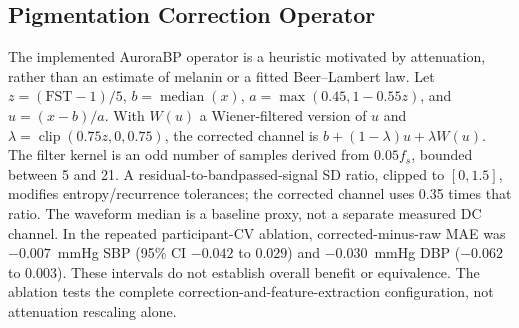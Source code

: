 \documentclass[journal]{IEEEtran}
\begin{document}
\subsection{Pigmentation Correction Operator}
\label{sec:pcop}
The implemented AuroraBP operator is a heuristic motivated by attenuation, rather than an estimate of melanin or a fitted Beer--Lambert law. Let $z=(\mathrm{FST}-1)/5$, $b=\operatorname{median}(x)$, $a=\max(0.45,1-0.55z)$, and $u=(x-b)/a$. With $W(u)$ a Wiener-filtered version of $u$ and $\lambda=\operatorname{clip}(0.75z,0,0.75)$, the corrected channel is $b+(1-\lambda)u+\lambda W(u)$. The filter kernel is an odd number of samples derived from $0.05f_s$, bounded between 5 and 21. A residual-to-bandpassed-signal SD ratio, clipped to $[0,1.5]$, modifies entropy/recurrence tolerances; the corrected channel uses 0.35 times that ratio. The waveform median is a baseline proxy, not a separate measured DC channel. In the repeated participant-CV ablation, corrected-minus-raw MAE was $-0.007$~mmHg SBP (95\% CI $-0.042$ to $0.029$) and $-0.030$~mmHg DBP ($-0.062$ to $0.003$). These intervals do not establish overall benefit or equivalence. The ablation tests the complete correction-and-feature-extraction configuration, not attenuation rescaling alone.
\end{document}
